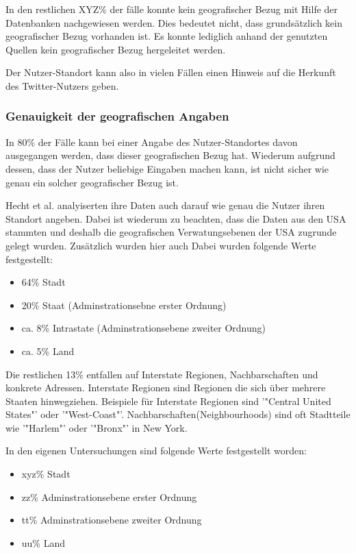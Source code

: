 					In den restlichen XYZ\% der fälle konnte kein geografischer Bezug mit Hilfe der Datenbanken nachgewiesen werden. 
					Dies bedeutet nicht, dass grundsätzlich kein geografischer Bezug vorhanden ist. 
					Es konnte lediglich anhand der genutzten Quellen kein geografischer Bezug hergeleitet werden.

					Der Nutzer-Standort kann also in vielen Fällen einen Hinweis auf die Herkunft des Twitter-Nutzers geben.

				\subsubsection{Genauigkeit der geografischen Angaben}

					In 80\% der Fälle kann bei einer Angabe des Nutzer-Standortes davon ausgegangen werden, dass dieser geografischen Bezug hat.
					Wiederum aufgrund dessen, dass der Nutzer beliebige Eingaben machen kann, ist nicht sicher wie genau ein solcher geografischer Bezug ist. 
					
					Hecht et al. analyiserten ihre Daten auch darauf wie genau die Nutzer ihren Standort angeben.
					Dabei ist wiederum zu beachten, dass die Daten aus den USA stammten und deshalb die geografischen Verwatungsebenen der USA zugrunde gelegt wurden.
					Zusätzlich wurden hier auch 
					Dabei wurden folgende Werte festgestellt:

					\begin{itemize}
					 	\item 64\% Stadt 
					 	\item 20\% Staat (Adminstrationsebne erster Ordnung)
					 	\item ca. 8\% Intrastate (Adminstrationsebene zweiter Ordnung)
					 	\item ca. 5\% Land
					 \end{itemize} 

					 Die restlichen 13\% entfallen auf Interstate Regionen, Nachbarschaften und konkrete Adressen. 
					 Interstate Regionen sind Regionen die sich über mehrere Staaten hinwegziehen. 
					 Beispiele für Interstate Regionen sind '"Central United States"' oder '"West-Coast"'.
					 Nachbarschaften(Neighbourhoods) sind oft Stadtteile wie '"Harlem"' oder '"Bronx"' in New York.

					 In den eigenen Untersuchungen sind folgende Werte festgestellt worden:

					\begin{itemize}
					 	\item xyz\% Stadt 
					 	\item zz\% Adminstrationsebene erster Ordnung
					 	\item tt\% Adminstrationsebene zweiter Ordnung
					 	\item uu\% Land
					 \end{itemize} 

